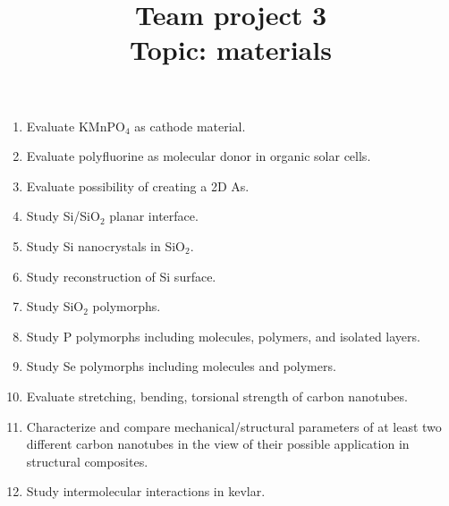 \documentclass{Project}
\begin{document}
\title{Team project 3 \\ Topic: materials}
\maketitle

\preface{}

\begin{enumerate}
\item Evaluate KMnPO$_4$ as cathode material.
\item Evaluate polyfluorine as molecular donor in organic solar cells.
\item Evaluate possibility of creating a 2D As.
\item Study Si/SiO$_2$ planar interface.
\item Study Si nanocrystals in SiO$_2$.
\item Study reconstruction of Si surface.
\item Study SiO$_2$ polymorphs.
\item Study P polymorphs including molecules, polymers, and isolated layers.
\item Study Se polymorphs including molecules and polymers.
\item Evaluate stretching, bending, torsional strength of carbon nanotubes.
\item Characterize and compare mechanical/structural parameters of at least
two different carbon nanotubes in the view of their possible application in structural composites.
\item Study intermolecular interactions in kevlar.
\end{enumerate}

\reminder{}
\end{document}
